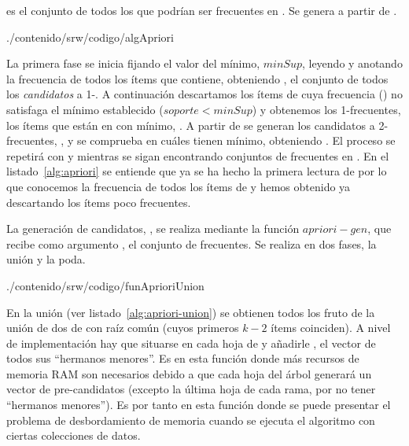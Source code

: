 \begin{Definition}
   \aprioriC es el conjunto de todos los \kitemsets que podrían ser frecuentes en \D. Se genera a partir de \aprioriL[k-1].
\label{def:1-3-2-cjto-candidatos}
\end{Definition}



                       {./contenido/srw/codigo/algApriori}
                 
La primera fase se inicia fijando el valor del \soporte mínimo, $minSup$, leyendo \D y anotando la frecuencia de todos los ítems que contiene, obteniendo \aprioriC[1], el conjunto de todos los \emph{candidatos} a 1-\itemset. A continuación descartamos los ítems de \aprioriC[1] cuya frecuencia (\soporte) no satisfaga el \soporte mínimo establecido ($soporte < minSup$) y obtenemos los 1-\itemsets frecuentes, los ítems que están en \D con \soporte mínimo, \aprioriL[1]. A partir de \aprioriL[1] se generan los candidatos a 2-\itemsets frecuentes, \aprioriC[2], y se comprueba en \D cuáles tienen \soporte mínimo, obteniendo \aprioriC[2]. El proceso se repetirá con \aprioriC y \aprioriL[k] mientras se sigan encontrando conjuntos de \kitemsets frecuentes en \D. En el listado~\ref{alg:apriori} se entiende que ya se ha hecho la primera lectura de \D por lo que conocemos la frecuencia de todos los ítems de \D y hemos obtenido ya \aprioriL[1] descartando los ítems poco frecuentes.

La generación de candidatos, \aprioriC, se realiza mediante la función $apriori-gen$, que recibe como argumento \aprioriL[k-1], el conjunto de \kitemsets[(k-1)] frecuentes. Se realiza en dos fases, la unión y la poda.


                       {./contenido/srw/codigo/funAprioriUnion}

En la unión (ver listado~\ref{alg:apriori-union}) se obtienen todos los \kitemsets fruto de la unión de dos \itemsets de \aprioriL[k-1] con raíz común (cuyos primeros $k-2$ ítems coinciden). A nivel de implementación hay que situarse en cada hoja de \aprioriL[k-1] y añadirle \aprioriC, el vector de todos sus "`hermanos menores"'. Es en esta función donde más recursos de memoria RAM son necesarios debido a que cada hoja del árbol \aprioriL generará un vector de pre-candidatos (excepto la última hoja de cada rama, por no tener "`hermanos menores"'). Es por tanto en esta función donde se puede presentar el problema de desbordamiento de memoria cuando se ejecuta el algoritmo con ciertas colecciones de datos.


